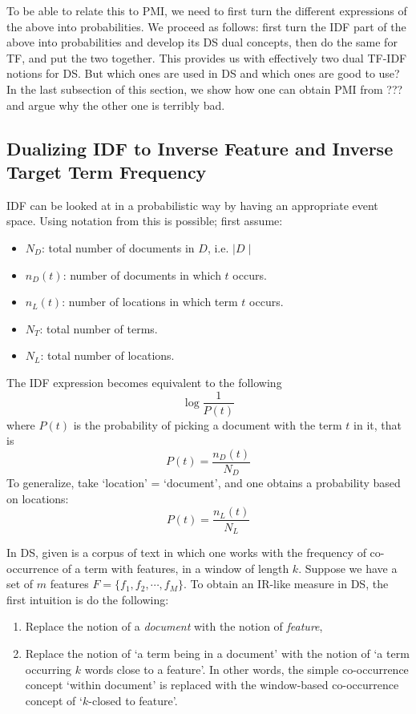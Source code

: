 To be able to relate this to PMI, we need to first turn the different expressions of the above into probabilities.  We proceed as follows:   first turn the IDF part of the above into probabilities and develop its DS dual concepts, then do the same for TF, and  put the two together.  This provides us with effectively two dual TF-IDF notions for DS.  But which ones are used in DS and which ones are good to use? In the last subsection of this section, we show how one can obtain PMI from ??? and argue why the other  one is terribly bad. 


\subsection{Dualizing  IDF to Inverse Feature  and Inverse Target Term Frequency }
\label{subsec-IDF}

IDF can be looked at in a probabilistic way by having an appropriate event space.  Using notation from   \cite{ThomasBook} this is possible;  first assume:
\begin{itemize}
\item $N_D$: total number of documents in $D$, i.e.   $\mid D \mid$
\item $n_D(t)$: number of documents in which $t$ occurs.
\item $n_L(t)$: number of locations in which  term $t$ occurs.
\item $N_T$: total number of terms.
\item $N_L$: total number of locations.
\end{itemize}

The  IDF expression becomes equivalent to the following 
\[
\log{\frac{1}{P(t)}}
\]
where $P(t)$  is the probability of picking a document with the term $t$ in it, that is 
\[
P(t) = \frac{n_D(t)}{N_D} 
\]
To generalize, take  `location' = `document', and one obtains a probability based on   locations:  
\[
P(t) = \frac{n_L(t)}{N_L}
\] 


\medskip
In DS, given is a corpus of text in which one works with the frequency of co-occurrence of a term with  features, in a window of length $k$.  Suppose we have a set of  $m$ features  $F = \{f_1, f_2, \cdots, f_M\}$.  To obtain an IR-like measure in DS, the first intuition is do the following:

\begin{enumerate}
\item   Replace the notion of a  \emph{document}  with the notion of  \emph{feature}, 
\item  Replace the notion of `a term being in a document'  with the notion of `a term occurring $k$ words close to a feature'.  In other words,  the  simple co-occurrence concept `within document' is replaced with the window-based co-occurrence concept of  `$k$-closed to feature'. 
\end{enumerate}

